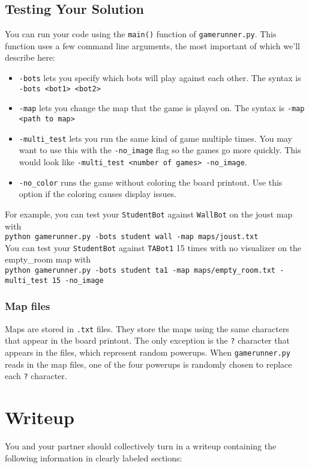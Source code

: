 \documentclass{article}
\begin{document}
    \subsection{Testing Your Solution}
    You can run your code using the \texttt{main()} function of \texttt{gamerunner.py}. This function uses a few command line arguments, the most important of which we'll describe here:
    \begin{itemize}
        \item \texttt{-bots} lets you specify which bots will play against each other. The syntax is \texttt{-bots <bot1> <bot2>}
        \item \texttt{-map} lets you change the map that the game is played on. The syntax is \texttt{-map <path to map>}
        \item \texttt{-multi\_test} lets you run the same kind of game multiple times. You may want to use this with the \texttt{-no\_image} flag so the games go more quickly. This would look like \texttt{-multi\_test <number of games> -no\_image}.
        \item \texttt{-no\_color} runs the game without coloring the board printout. Use this option if the coloring causes display issues.
    \end{itemize}
    For example, you can test your \texttt{StudentBot} against \texttt{WallBot} on the joust map with \\

    \texttt{python gamerunner.py -bots student wall -map maps/joust.txt} \\

    You can test your \texttt{StudentBot} against \texttt{TABot1} 15 times with no visualizer on the empty\_room map with\\

    \texttt{python gamerunner.py -bots student ta1 -map
    maps/empty\_room.txt -multi\_test 15 -no\_image}

    \subsubsection{Map files}
    Maps are stored in \texttt{.txt} files. They store the maps using the same characters that appear in the board printout. The only exception is the \texttt{?} character that appears in the files, which represent random powerups. When \texttt{gamerunner.py} reads in the map files, one of the four powerups is randomly chosen to replace each \texttt{?} character.

\section{Writeup}
You and your partner should collectively turn in a writeup containing the following information in clearly labeled sections:
\end{document}
